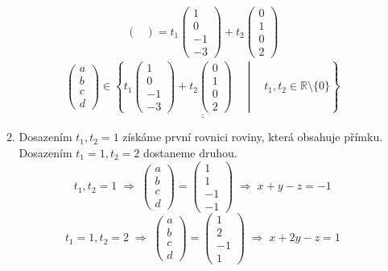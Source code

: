 \documentclass[12pt]{article}
\begin{document}
\begin{enumerate}
\begin{enumerate}
\begin{align*}
\begin{pmatrix}
        \end{pmatrix} = t_1
        \begin{pmatrix}
          1 \\ 0 \\ -1 \\ -3
        \end{pmatrix} +
        t_2
        \begin{pmatrix}
          0 \\ 1 \\ 0 \\ 2
        \end{pmatrix}
      \end{align*}
      \[
        \underline{\underline{
          \begin{pmatrix}
            a \\ b \\ c \\ d
          \end{pmatrix} \in \left\{
            t_1
            \begin{pmatrix}
              1 \\ 0 \\ -1 \\ -3
            \end{pmatrix} +
            t_2
            \begin{pmatrix}
              0 \\ 1 \\ 0 \\ 2
            \end{pmatrix} 
            \quad \middle| \quad t_1,t_2 \in \mathbb{R} \setminus \{0\} 
            \right\} 
          }}
      \]

      \item Dosazením $t_1,t_2=1$ získáme první rovnici roviny, která obsahuje přímku. Dosazením $t_1=1,t_2=2$ dostaneme druhou.
            \[
            t_1,t_2=1 \;\Rightarrow\; \begin{pmatrix}
              a\\b\\c\\d
            \end{pmatrix} = \begin{pmatrix}
              1 \\ 1 \\ -1 \\ -1
            \end{pmatrix} \;\Rightarrow\; x+y-z=-1
            \]
            \[
            t_1=1,t_2=2 \;\Rightarrow\; \begin{pmatrix}
              a\\b\\c\\d
            \end{pmatrix} = \begin{pmatrix}
              1 \\ 2\\-1\\1
            \end{pmatrix} \;\Rightarrow\; x+2y-z=1
            \]


\end{enumerate}
\end{enumerate}
\end{document}
